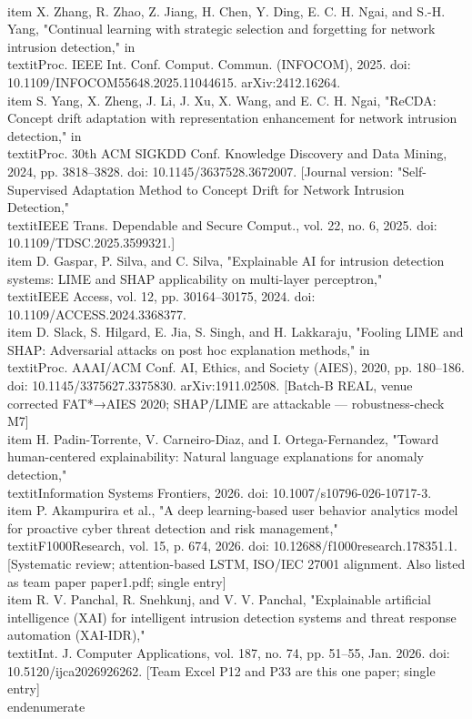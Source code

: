 \documentclass[12pt,a4paper,oneside]{report}
\begin{document}
\\item X. Zhang, R. Zhao, Z. Jiang, H. Chen, Y. Ding, E. C. H. Ngai, and S.-H. Yang, "Continual learning with strategic selection and forgetting for network intrusion detection," in \\textit{Proc. IEEE Int. Conf. Comput. Commun. (INFOCOM)}, 2025. doi: 10.1109/INFOCOM55648.2025.11044615. arXiv:2412.16264.
\\item S. Yang, X. Zheng, J. Li, J. Xu, X. Wang, and E. C. H. Ngai, "ReCDA: Concept drift adaptation with representation enhancement for network intrusion detection," in \\textit{Proc. 30th ACM SIGKDD Conf. Knowledge Discovery and Data Mining}, 2024, pp. 3818–3828. doi: 10.1145/3637528.3672007. [Journal version: "Self-Supervised Adaptation Method to Concept Drift for Network Intrusion Detection," \\textit{IEEE Trans. Dependable and Secure Comput.}, vol. 22, no. 6, 2025. doi: 10.1109/TDSC.2025.3599321.]
\\item D. Gaspar, P. Silva, and C. Silva, "Explainable AI for intrusion detection systems: LIME and SHAP applicability on multi-layer perceptron," \\textit{IEEE Access}, vol. 12, pp. 30164–30175, 2024. doi: 10.1109/ACCESS.2024.3368377.
\\item D. Slack, S. Hilgard, E. Jia, S. Singh, and H. Lakkaraju, "Fooling LIME and SHAP: Adversarial attacks on post hoc explanation methods," in \\textit{Proc. AAAI/ACM Conf. AI, Ethics, and Society (AIES)}, 2020, pp. 180–186. doi: 10.1145/3375627.3375830. arXiv:1911.02508. [Batch-B REAL, venue corrected FAT*→AIES 2020; SHAP/LIME are attackable — robustness-check M7]
\\item H. Padin-Torrente, V. Carneiro-Diaz, and I. Ortega-Fernandez, "Toward human-centered explainability: Natural language explanations for anomaly detection," \\textit{Information Systems Frontiers}, 2026. doi: 10.1007/s10796-026-10717-3.
\\item P. Akampurira et al., "A deep learning-based user behavior analytics model for proactive cyber threat detection and risk management," \\textit{F1000Research}, vol. 15, p. 674, 2026. doi: 10.12688/f1000research.178351.1. [Systematic review; attention-based LSTM, ISO/IEC 27001 alignment. Also listed as team paper paper1.pdf; single entry]
\\item R. V. Panchal, R. Snehkunj, and V. V. Panchal, "Explainable artificial intelligence (XAI) for intelligent intrusion detection systems and threat response automation (XAI-IDR)," \\textit{Int. J. Computer Applications}, vol. 187, no. 74, pp. 51–55, Jan. 2026. doi: 10.5120/ijca2026926262. [Team Excel P12 and P33 are this one paper; single entry]
\\end{enumerate}
\end{document}
